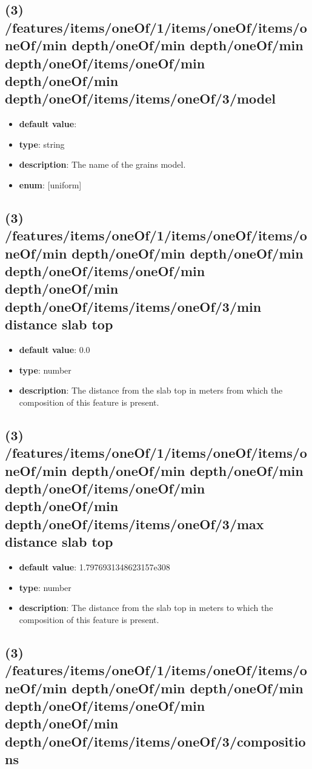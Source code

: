 \subsection{(3) /features/items/oneOf/1/items/oneOf/items/oneOf/min depth/oneOf/min depth/oneOf/min depth/oneOf/items/oneOf/min depth/oneOf/min depth/oneOf/items/items/oneOf/3/model}
\begin{itemize}[leftmargin=3em]\item {\bf default value}: 
\item {\bf type}: string
\item {\bf description}: The name of the grains model.
\item {\bf enum}: [uniform]\end{itemize}\subsection{(3) /features/items/oneOf/1/items/oneOf/items/oneOf/min depth/oneOf/min depth/oneOf/min depth/oneOf/items/oneOf/min depth/oneOf/min depth/oneOf/items/items/oneOf/3/min distance slab top}
\begin{itemize}[leftmargin=3em]\item {\bf default value}: 0.0
\item {\bf type}: number
\item {\bf description}: The distance from the slab top in meters from which the composition of this feature is present.
\end{itemize}\subsection{(3) /features/items/oneOf/1/items/oneOf/items/oneOf/min depth/oneOf/min depth/oneOf/min depth/oneOf/items/oneOf/min depth/oneOf/min depth/oneOf/items/items/oneOf/3/max distance slab top}
\begin{itemize}[leftmargin=3em]\item {\bf default value}: 1.7976931348623157e308
\item {\bf type}: number
\item {\bf description}: The distance from the slab top in meters to which the composition of this feature is present.
\end{itemize}\subsection{(3) /features/items/oneOf/1/items/oneOf/items/oneOf/min depth/oneOf/min depth/oneOf/min depth/oneOf/items/oneOf/min depth/oneOf/min depth/oneOf/items/items/oneOf/3/compositions}
